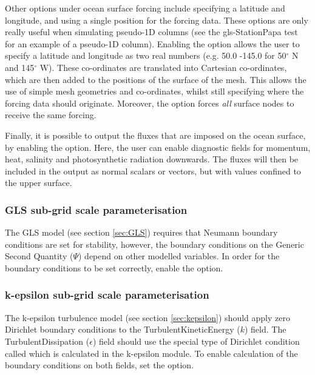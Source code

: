 Other options under ocean surface forcing include specifying a latitude and longitude, and using a single position for the
forcing data. These options are only really useful when simulating pseudo-1D columns (see the gls-StationPapa test for an example
of a pseudo-1D column). Enabling the  option allows the user to specify a latitude and longitude as
two real numbers (e.g. 50.0 -145.0 for 50$^\circ$ N and 145$^\circ$ W). These co-ordinates are translated into Cartesian
co-ordinates, which are then added to the positions of the surface of the mesh. This allows the use of simple mesh geometries
and co-ordinates, whilst still specifying where the forcing data should originate. Moreover, the 
option forces \emph{all} surface nodes to receive the same forcing.

Finally, it is possible to output the fluxes that are imposed on the ocean surface, by enabling the
 option. Here, the user can enable diagnostic fields for momentum, heat, salinity and
photosynthetic radiation downwards. The fluxes will then be included in the output as normal scalars or vectors, but with values
confined to the upper surface.

\subsubsection{GLS sub-grid scale parameterisation}\label{sec:BCs:special:gls}

The GLS model (see section \ref{sec:GLS}) requires that Neumann boundary
conditions are set for stability, however, the boundary conditions on the
Generic Second Quantity ($\Psi$) depend on other modelled variables. In
order for the boundary conditions to be set correctly, enable the \linebreak
{}
option.

\subsubsection{k-epsilon sub-grid scale parameterisation} \label{sec:BCs:special:kepsilon}

The k-epsilon turbulence model (see section \ref{sec:kepsilon}) should apply zero
Dirichlet boundary conditions to the TurbulentKineticEnergy ($k$) field. The
TurbulentDissipation ($\epsilon$) field should use the special type of Dirichlet condition
called  which is calculated in the k-epsilon module. To enable
calculation of the boundary conditions on both fields, set the \linebreak
{} option.


